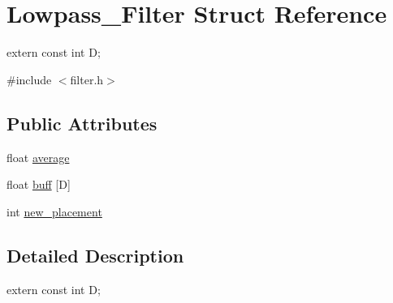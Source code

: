 \hypertarget{struct_lowpass___filter}{\section{Lowpass\-\_\-\-Filter Struct Reference}
\label{struct_lowpass___filter}
}


extern const int D;  




{\ttfamily \#include $<$filter.\-h$>$}

\subsection*{Public Attributes}
\begin{DoxyCompactItemize}
\item 
float \hyperlink{struct_lowpass___filter_af4a4ffb094091c8aab28cfb9d6f4d295}{average}
\item 
float \hyperlink{struct_lowpass___filter_a07a03e4c0421fe68ec73d04f81bb4958}{buff} \mbox{[}D\mbox{]}
\item 
int \hyperlink{struct_lowpass___filter_a9095f7e48ca87295fb2017b273033913}{new\-\_\-placement}
\end{DoxyCompactItemize}


\subsection{Detailed Description}
extern const int D; 

